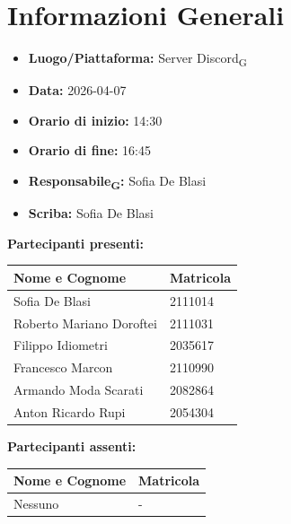 \section{Informazioni Generali}
\begin{itemize}
	\item \textbf{Luogo/Piattaforma:} {Server Discord\textsubscript{G}}
	\item \textbf{Data:} 2026-04-07
	\item \textbf{Orario di inizio:} 14:30
	\item \textbf{Orario di fine:} 16:45
	\item \textbf{Responsabile\textsubscript{G}:} {Sofia De Blasi}
	\item \textbf{Scriba:} {Sofia De Blasi}
\end{itemize}

\vspace{0.5cm}
\textbf{Partecipanti presenti:}
\begin{table}[ht]
	\centering
	\renewcommand{\arraystretch}{1.2}
	\begin{tabularx}{\textwidth}{X l}
		\toprule
		\textbf{Nome e Cognome} & \textbf{Matricola} \\
		\midrule
		Sofia De Blasi & 2111014 \\
		Roberto Mariano Doroftei & 2111031 \\
		Filippo Idiometri & 2035617 \\
		Francesco Marcon & 2110990 \\
		Armando Moda Scarati & 2082864 \\
		Anton Ricardo Rupi & 2054304 \\
		\bottomrule
	\end{tabularx}
\end{table}

\vspace{0.5cm}
\textbf{Partecipanti assenti:}
\begin{table}[ht]
	\centering
	\renewcommand{\arraystretch}{1.2}
	\begin{tabularx}{\textwidth}{X l}
		\toprule
		\textbf{Nome e Cognome} & \textbf{Matricola} \\
		\midrule
		Nessuno & - \\
		\bottomrule
	\end{tabularx}
\end{table}

